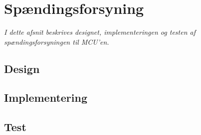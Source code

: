 \section{Spændingsforsyning}
\textit{I dette afsnit beskrives designet, implementeringen og testen af spændingsforsyningen til MCU'en.}

\subsection{Design}
\subsection{Implementering}
\subsection{Test}